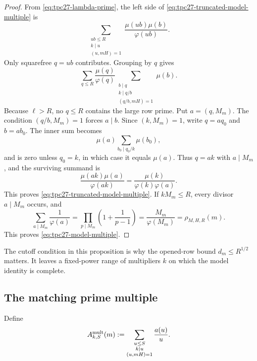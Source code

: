 \begin{proof}
From \eqref{eq:tpc27-lambda-prime}, the left side of
\eqref{eq:tpc27-truncated-model-multiple} is
\begin{equation}
 \sum_{\substack{ub\le R\\k\mid u\\(u,mH)=1}}
 \frac{\mu(ub)\mu(b)}{\varphi(ub)}.
 \label{eq:tpc27-model-double-sum}
\end{equation}
Only squarefree \(q=ub\) contributes.  Grouping by \(q\) gives
\begin{equation}
 \sum_{q\le R}\frac{\mu(q)}{\varphi(q)}
 \sum_{\substack{b\mid q\\k\mid q/b\\(q/b,mH)=1}}
 \mu(b).
 \label{eq:tpc27-model-group-q}
\end{equation}
Because \(\ell>R\), no \(q\le R\) contains the large row prime.  Put
\(a=(q,M_m)\).  The condition \((q/b,M_m)=1\) forces \(a\mid b\).
Since \((k,M_m)=1\), write \(q=a q_0\) and \(b=a b_0\).  The inner
sum becomes
\begin{equation}
 \mu(a)\sum_{b_0\mid q_0/k}\mu(b_0),
 \label{eq:tpc27-inner-Mobius-collapse}
\end{equation}
and is zero unless \(q_0=k\), in which case it equals \(\mu(a)\).
Thus \(q=ak\) with \(a\mid M_m\), and the surviving summand is
\begin{equation}
 \frac{\mu(ak)\mu(a)}{\varphi(ak)}
 =\frac{\mu(k)}{\varphi(k)\varphi(a)}.
\end{equation}
This proves \eqref{eq:tpc27-truncated-model-multiple}.  If
\(kM_m\le R\), every divisor \(a\mid M_m\) occurs, and
\begin{equation}
 \sum_{a\mid M_m}\frac1{\varphi(a)}
 =\prod_{p\mid M_m}\left(1+\frac1{p-1}\right)
 =\frac{M_m}{\varphi(M_m)}
 =\rho_{M,H,R}(m).
\end{equation}
This proves \eqref{eq:tpc27-model-multiple}.
\end{proof}

The cutoff condition in this proposition is why the opened-row bound
\(d_m\le R^{1/2}\) matters.  It leaves a fixed-power range of
multipliers \(k\) on which the model identity is complete.

\subsection{The matching prime multiple}

Define
\begin{equation}
 A_{k,S}^{\rm mult}(m)
 :=\sum_{\substack{u\le S\\k\mid u\\(u,mH)=1}}
 \frac{a(u)}u.
 \label{eq:tpc27-prime-multiple-def}
\end{equation}


